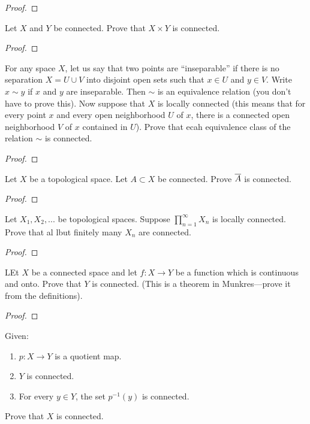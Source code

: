 \begin{proof}
\end{proof}
\begin{problem}
Let $X$ and $Y$ be connected. Prove that $X\times Y$ is connected.
\end{problem}
\begin{proof}
\end{proof}
\begin{problem}
For any space $X$, let us say that two points are ``inseparable''
if there is no separation $X=U\cup V$ into disjoint open sets
such that $x\in U$ and $y\in V$. Write $x\sim y$ if $x$ and $y$
are inseparable. Then $\sim$ is an equivalence relation (you
don't have to prove this). Now suppose that $X$ is locally
connected (this means that for every point $x$ and every open
neighborhood $U$ of $x$, there is a connected open neighborhood
$V$ of $x$ contained in $U$). Prove that ecah equivalence class
of the relation $\sim$ is connected.
\end{problem}
\begin{proof}
\end{proof}
\begin{problem}
Let $X$ be a topological space. Let $A\subset X$ be
connected. Prove $\overline{A}$ is connected.
\end{problem}
\begin{proof}
\end{proof}
\begin{problem}
Let $X_1,X_2,...$ be topological spaces. Suppose
$\prod_{n=1}^\infty X_n$ is locally connected. Prove that al lbut
finitely many $X_n$ are connected.
\end{problem}
\begin{proof}
\end{proof}
\begin{problem}
LEt $X$ be a connected space and let $f\colon X\to Y$ be a
function which is continuous and onto. Prove that $Y$ is
connected. (This is a theorem in Munkres---prove it from the
definitions).
\end{problem}
\begin{proof}
\end{proof}
\begin{problem}
Given:
\begin{enumerate}[noitemsep,label=(\roman*)]
\item $p\colon X\to Y$ is a quotient map.
\item $Y$ is connected.
\item For every $y\in Y$, the set $p^{-1}(y)$ is connected.
\end{enumerate}
Prove that $X$ is connected.
\end{problem}
